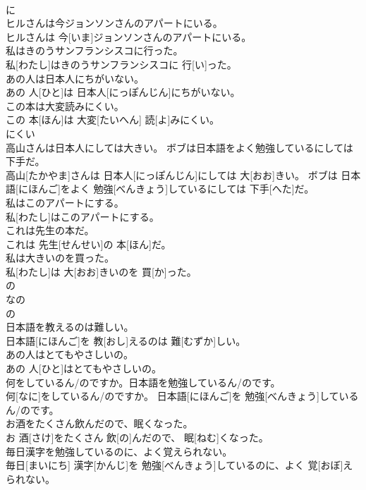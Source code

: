 \documentclass[8pt]{extreport}
\begin{document}
\begin{CJK}{UTF8}{min}
\\	に	
\\	ヒルさんは今ジョンソンさんのアパートにいる。	
\\	ヒルさんは 今[いま]ジョンソンさんのアパートにいる。	
\\	私はきのうサンフランシスコに行った。	
\\	私[わたし]はきのうサンフランシスコに 行[い]った。	
\\	あの人は日本人にちがいない。	
\\	あの 人[ひと]は 日本人[にっぽんじん]にちがいない。	
\\	この本は大変読みにくい。	
\\	この 本[ほん]は 大変[たいへん] 読[よ]みにくい。	
\\	にくい	
\\	高山さんは日本人にしては大きい。 ボブは日本語をよく勉強しているにしては下手だ。	
\\	高山[たかやま]さんは 日本人[にっぽんじん]にしては 大[おお]きい。 ボブは 日本語[にほんご]をよく 勉強[べんきょう]しているにしては 下手[へた]だ。	
\\	私はこのアパートにする。	
\\	私[わたし]はこのアパートにする。	
\\	これは先生の本だ。	
\\	これは 先生[せんせい]の 本[ほん]だ。	
\\	私は大きいのを買った。	
\\	私[わたし]は 大[おお]きいのを 買[か]った。	
\\	の 
\\	なの 
\\	の	
\\	日本語を教えるのは難しい。	
\\	日本語[にほんご]を 教[おし]えるのは 難[むずか]しい。	
\\	あの人はとてもやさしいの。	
\\	あの 人[ひと]はとてもやさしいの。	
\\	何をしているん/のですか。日本語を勉強しているん/のです。	
\\	何[なに]をしているん/のですか。 日本語[にほんご]を 勉強[べんきょう]しているん/のです。	
\\	お酒をたくさん飲んだので、眠くなった。	
\\	お 酒[さけ]をたくさん 飲[の]んだので、 眠[ねむ]くなった。	
\\	毎日漢字を勉強しているのに、よく覚えられない。	
\\	毎日[まいにち] 漢字[かんじ]を 勉強[べんきょう]しているのに、よく 覚[おぼ]えられない。	

\end{CJK}
\end{document}
